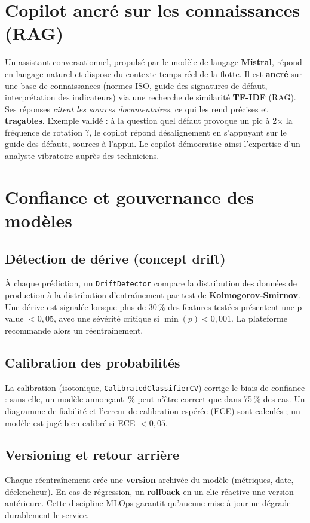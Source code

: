 \section{Copilot ancré sur les connaissances (RAG)}
Un assistant conversationnel, propulsé par le modèle de langage \textbf{Mistral}, répond en
langage naturel et dispose du contexte temps réel de la flotte. Il est \textbf{ancré} sur une
base de connaissances (normes ISO, guide des signatures de défaut, interprétation des
indicateurs) via une recherche de similarité \textbf{TF-IDF} (RAG). Ses réponses
\emph{citent les sources documentaires}, ce qui les rend précises et \textbf{traçables}.
Exemple validé : à la question \og quel défaut provoque un pic à 2$\times$ la fréquence de
rotation ?\fg, le copilot répond \og désalignement \fg{} en s'appuyant sur le guide des
défauts, sources à l'appui. Le copilot démocratise ainsi l'expertise d'un analyste vibratoire
auprès des techniciens.

\section{Confiance et gouvernance des modèles}
\subsection{Détection de dérive (concept drift)}
À chaque prédiction, un \texttt{DriftDetector} compare la distribution des données de
production à la distribution d'entraînement par test de \textbf{Kolmogorov-Smirnov}. Une
dérive est signalée lorsque plus de 30\,\% des features testées présentent une p-value
$< 0{,}05$, avec une sévérité critique si $\min(p)<0{,}001$. La plateforme recommande alors
un réentraînement.

\subsection{Calibration des probabilités}
La calibration (isotonique, \texttt{CalibratedClassifierCV}) corrige le biais de confiance :
sans elle, un modèle annonçant \,\% \fg{} peut n'être correct que dans 75\,\% des cas.
Un diagramme de fiabilité et l'erreur de calibration espérée (ECE) sont calculés ; un modèle
est jugé bien calibré si ECE $< 0{,}05$.

\subsection{Versioning et retour arrière}
Chaque réentraînement crée une \textbf{version} archivée du modèle (métriques, date,
déclencheur). En cas de régression, un \textbf{rollback} en un clic réactive une version
antérieure. Cette discipline MLOps garantit qu'aucune mise à jour ne dégrade durablement le
service.

